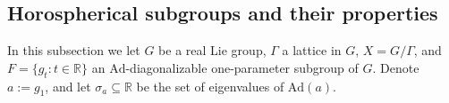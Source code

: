 \documentclass[reqno,12pt]{amsart}
\theoremstyle{definition}
\numberwithin{equation}{section}
\newcommand{\RR}{\mathbb{R}}
\newcommand{\Ad}{\mathrm{Ad}}
\newcommand {\comm}[1]   {\textcolor{red}{#1}}
\newcommand{\ggm}{G/\Gamma}
\begin{document}
\subsection{Horospherical subgroups and their properties} \label{horosph} {In this subsection we let $G$ be a real Lie group, $\Gamma$   a lattice in $G$, $X = \ggm$, and $F=\{g_t:t \in \RR\}$   {an $\Ad$-diagonalizable} one-parameter subgroup of $G$.} {Denote $a:= g_1$, 
and let $\sigma_a
\subseteq\RR$ be the set of eigenvalues of $\Ad(a)$.}
\end{document}
